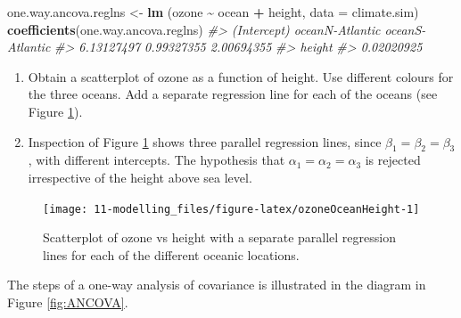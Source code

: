 \documentclass[
]{book}
\newenvironment{Shaded}{\begin{snugshade}}{\end{snugshade}}
\newcommand{\AttributeTok}[1]{\textcolor[rgb]{0.13,0.29,0.53}{#1}}
\newcommand{\CommentTok}[1]{\textcolor[rgb]{0.56,0.35,0.01}{\textit{#1}}}
\newcommand{\FunctionTok}[1]{\textcolor[rgb]{0.13,0.29,0.53}{\textbf{#1}}}
\newcommand{\NormalTok}[1]{#1}
\newcommand{\OtherTok}[1]{\textcolor[rgb]{0.56,0.35,0.01}{#1}}
\newcommand{\SpecialCharTok}[1]{\textcolor[rgb]{0.81,0.36,0.00}{\textbf{#1}}}
\begin{document}
\begin{Shaded}
\begin{Highlighting}[]
\NormalTok{one.way.ancova.reglns }\OtherTok{\textless{}{-}} \FunctionTok{lm}\NormalTok{ (ozone }\SpecialCharTok{\textasciitilde{}}\NormalTok{ ocean }\SpecialCharTok{+}\NormalTok{ height, }\AttributeTok{data =}\NormalTok{ climate.sim)}
\FunctionTok{coefficients}\NormalTok{(one.way.ancova.reglns)}
\CommentTok{\#\textgreater{}     (Intercept) oceanN{-}Atlantic oceanS{-}Atlantic }
\CommentTok{\#\textgreater{}      6.13127497      0.99327355      2.00694355 }
\CommentTok{\#\textgreater{}          height }
\CommentTok{\#\textgreater{}      0.02020925}
\end{Highlighting}
\end{Shaded}

\begin{enumerate}
\def\labelenumi{(\roman{enumi})}
\setcounter{enumi}{1}
\item
  Obtain a scatterplot of ozone as a function of height. Use different colours for the three oceans. Add a separate regression line for each of the oceans (see Figure \ref{fig:ozoneOceanHeight}).
\item
  Inspection of Figure \ref{fig:ozoneOceanHeight} shows three parallel regression lines, since \(\beta_1 = \beta_2 = \beta_3\), with different intercepts. The hypothesis that \(\alpha_1 = \alpha_2 = \alpha_3\) is rejected irrespective of the height above sea level.
\end{enumerate}

\begin{figure}
\texttt{[image: 11-modelling\_files/figure-latex/ozoneOceanHeight-1]} \caption{Scatterplot of ozone vs height with a separate parallel regression lines for each of the different oceanic locations.}\label{fig:ozoneOceanHeight}
\end{figure}

The steps of a one-way analysis of covariance is illustrated in the diagram in Figure \ref{fig:ANCOVA}.
\end{document}
